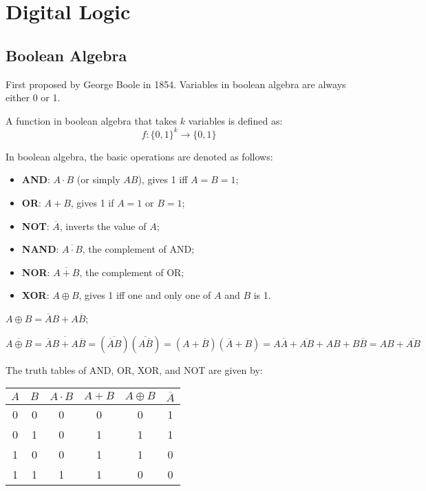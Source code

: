 \section{Digital Logic}

\subsection{Boolean Algebra}
First proposed by George Boole in 1854.
Variables in boolean algebra are always either 0 or 1.

\begin{definition}\label{def:boolean-function}
    A function in boolean algebra that takes $k$ variables is defined as:
    \begin{equation*}
        f: \{0,1\}^k \rightarrow \{0,1\}
    \end{equation*}
\end{definition}

\begin{definition}
    In boolean algebra, the basic operations are denoted as follows:
    \begin{itemize}
        \item \textbf{AND}: $A\cdot B$ (or simply $AB$), gives 1 iff $A=B=1$;
        \item \textbf{OR}:  $A+B$, gives 1 if $A=1$ or $B=1$;
        \item \textbf{NOT}: $\overline{A}$, inverts the value of $A$;
        \item \textbf{NAND}: $\overline{A\cdot B}$, the complement of AND;
        \item \textbf{NOR}: $\overline{A+B}$, the complement of OR;
        \item \textbf{XOR}: $A\oplus B$, gives 1 iff one and only one of $A$ and $B$ is 1.
    \end{itemize}
\end{definition}

\begin{remark}
    $A\oplus B = \overline{A}B + A\overline{B}$;

    $\overline{A\oplus B} = \overline{\overline{A}B + A\overline{B}}
    = (\overline{\overline{A}B})(\overline{A\overline{B}}) = (A+\overline{B})(\overline{A}+B)
    = A\overline{A}+\overline{AB}+AB+B\overline{B} = AB+\overline{AB}$
\end{remark}

The truth tables of AND, OR, XOR, and NOT are given by:
\begin{table}[H]
\centering
\begin{tabular}{|c|c||c|c|c|c|}
    \hline
    $A$ & $B$ & $A\cdot B$ & $A+B$ & $A\oplus B$ & $\overline{A}$\\
    \hline
    0 & 0 & 0 & 0 & 0 & 1 \\
    0 & 1 & 0 & 1 & 1 & 1 \\
    1 & 0 & 0 & 1 & 1 & 0 \\
    1 & 1 & 1 & 1 & 0 & 0 \\
    \hline
\end{tabular}
\end{table}

